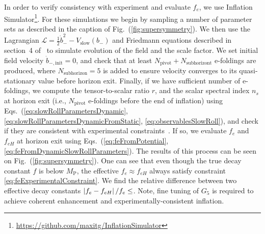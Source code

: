 \documentclass[11pt]{article}
\begin{document}
In order to verify consistency with experiment and evaluate $f_e$, we use Inflation Simulator\footnote{\url{https://github.com/maxitg/InflationSimulator}}.
For these simulations we begin by sampling a number of parameter sets as described in the caption of Fig.~(\ref{fig:supersymmetry}).
We then use the Lagrangian $\mathcal{L} = \frac{1}{2} \dot b_-^2 - V_\text{slow}\left(b_-\right)$ and Friedmann equations described in section~4 of~\cite{Nath:2018xxe} to simulate evolution of the field and the scale factor.
We set initial field velocity $\dot b_{-, \text{init}} = 0$, and check that at least $N_\text{pivot} + N_\text{subhorizont}$ e-foldings are produced, where $N_\text{subhorizon} = 5$ is added to ensure velocity converges to its quasi-stationary value before horizon exit.
Finally, if we have sufficient number of e-foldings, we compute the tensor-to-scalar ratio $r$, and the scalar spectral index $n_s$ at horizon exit (i.e., $N_\text{pivot}$ e-foldings before the end of inflation) using Eqs.~(\ref{eq:slowRollParametersDynamic}, \ref{eq:slowRollParametersDynamicFromStatic}, \ref{eq:observablesSlowRoll}), and check if they are consistent with experimental constraints~\cite{Akrami:2018odb}.
If so, we evaluate $f_e$ and $f_{eH}$ at horizon exit using Eqs.~(\ref{eq:feFromPotential}, \ref{eq:feFromDynamicSlowRollParameters}).
The results of this process can be seen on Fig.~(\ref{fig:supersymmetry}).
One can see that even though the true decay constant $f$ is below $M_\text{P}$, the effective $f_e \approx f_{eH}$ always satisfy constraint \ref{eq:feExperimentalConstraint}.
We find the relative difference between two effective decay constants $\left|f_e - f_{eH}\right| / f_e \le \protect$.
Note, fine tuning of $G_5$ is required to achieve coherent enhancement and experimentally-consistent inflation.
\end{document}
